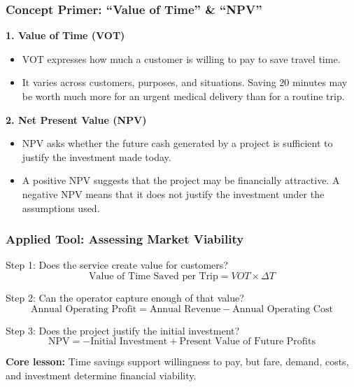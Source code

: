 \documentclass{beamer}
\begin{document}
\begin{frame}[t]
  \frametitle{Concept Primer: ``Value of Time'' \& ``NPV''}
  \textbf{1. Value of Time (VOT)}
  \begin{itemize}
    \item VOT expresses how much a customer is willing to pay to save travel time.
    \item It varies across customers, purposes, and situations. Saving 20 minutes may be worth much more for an urgent medical delivery than for a routine trip.
  \end{itemize}
  \vspace{0.25cm}
  \textbf{2. Net Present Value (NPV)}
  \begin{itemize}
    \item NPV asks whether the future cash generated by a project is sufficient to justify the investment made today.
    \item A positive NPV suggests that the project may be financially attractive. A negative NPV means that it does not justify the investment under the assumptions used.
  \end{itemize}
\end{frame}

\begin{frame}[t]
  \frametitle{Applied Tool: Assessing Market Viability}
  \begin{block}{Step 1: Does the service create value for customers?}
  \[
    \text{Value of Time Saved per Trip}=VOT\times\Delta T
  \]
  \end{block}
  \begin{block}{Step 2: Can the operator capture enough of that value?}
  \[
    \text{Annual Operating Profit}=\text{Annual Revenue}-\text{Annual Operating Cost}
  \]
  \end{block}
  \begin{block}{Step 3: Does the project justify the initial investment?}
  \[
    \text{NPV}=-\text{Initial Investment}+\text{Present Value of Future Profits}
  \]
  \end{block}
  \textbf{Core lesson:} Time savings support willingness to pay, but fare, demand, costs, and investment determine financial viability.
\end{frame}
\end{document}
